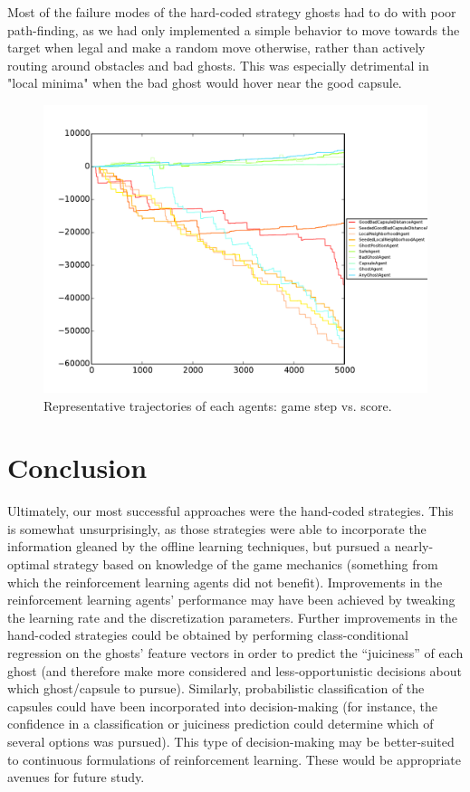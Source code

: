 \documentclass[11pt]{amsart}
\begin{document}
Most of the failure modes of the hard-coded strategy ghosts had to do with poor path-finding, as we had only implemented a simple behavior to move towards the target when legal and make a random move otherwise, rather than actively routing around obstacles and bad ghosts. This was especially detrimental in "local minima" when the bad ghost would hover near the good capsule.

\begin{figure}
	\includegraphics[width=\textwidth]{agents-trajectories.pdf}
	\caption{Representative trajectories of each agents: game step vs. score.}
	\label{fig:agents-trajectories}
\end{figure}


\section{Conclusion}

Ultimately, our most successful approaches were the hand-coded strategies. This is somewhat unsurprisingly, as those strategies were able to incorporate the information gleaned by the offline learning techniques, but pursued a nearly-optimal strategy based on knowledge of the game mechanics (something from which the reinforcement learning agents did not benefit). Improvements in the reinforcement learning agents' performance may have been achieved by tweaking the learning rate and the discretization parameters. Further improvements in the hand-coded strategies could be obtained by performing class-conditional regression on the ghosts' feature vectors in order to predict the ``juiciness'' of each ghost (and therefore make more considered and less-opportunistic decisions about which ghost/capsule to pursue). Similarly, probabilistic classification of the capsules could have been incorporated into decision-making (for instance, the confidence in a classification or juiciness prediction could determine which of several options was pursued). This type of decision-making may be better-suited to continuous formulations of reinforcement learning. These would be appropriate avenues for future study.
\end{document}
